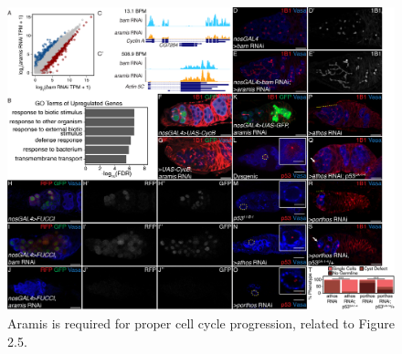 \documentclass[12pt,oneside]{reedthesis}
\begin{document}
\begin{figure}

{\centering \includegraphics[width=7 in,height=5.409091 in]{./figure/Ribosome Biogenesis/Ribosome Biogenesis 3S} 

}

\caption[Aramis is required for proper cell cycle progression, related to Figure 2.5.]{Aramis is required for proper cell cycle progression, related to Figure 2.5.}\label{fig:unnamed-chunk-11}
\end{figure}
\end{document}
